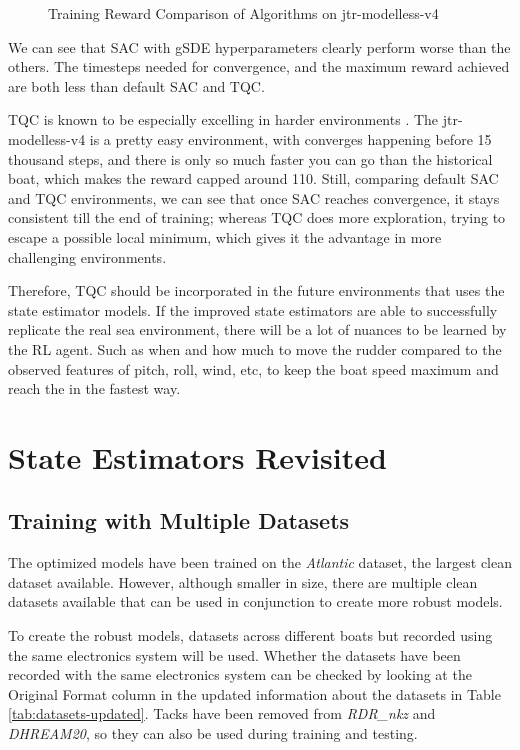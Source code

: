 \documentclass[12pt,twoside]{report}
\begin{document}
\begin{figure}[h]
\begin{subfigure}[b]{0.48\textwidth}
    \end{subfigure}
    \caption{Training Reward Comparison of Algorithms on jtr-modelless-v4}
    \label{fig:rl-comparison}
\end{figure}

We can see that SAC with gSDE hyperparameters clearly perform worse than the others. The timesteps needed for convergence, and the maximum reward achieved are both less than default SAC and TQC. 

TQC is known to be especially excelling in harder environments \cite{tqc-paper}. The jtr-modelless-v4 is a pretty easy environment, with converges happening before 15 thousand steps, and there is only so much faster you can go than the historical boat, which makes the reward capped around 110. Still, comparing default SAC and TQC environments, we can see that once SAC reaches convergence, it stays consistent till the end of training; whereas TQC does more exploration, trying to escape a possible local minimum, which gives it the advantage in more challenging environments. 

Therefore, TQC should be incorporated in the future environments that uses the state estimator models. If the improved state estimators are able to successfully replicate the real sea environment, there will be a lot of nuances to be learned by the RL agent. Such as when and how much to move the rudder compared to the observed features of pitch, roll, wind, etc, to keep the boat speed maximum and reach the in the fastest way.

\chapter{State Estimators Revisited}

\section{Training with Multiple Datasets}
The optimized models have been trained on the \textit{Atlantic} dataset, the largest clean dataset available. However, although smaller in size, there are multiple clean datasets available that can be used in conjunction to create more robust models.

To create the robust models, datasets across different boats but recorded using the same electronics system will be used. Whether the datasets have been recorded with the same electronics system can be checked by looking at the Original Format column in the updated information about the datasets in Table \ref{tab:datasets-updated}. Tacks have been removed from \textit{RDR\_nkz} and \textit{DHREAM20}, so they can also be used during training and testing.
\end{document}
